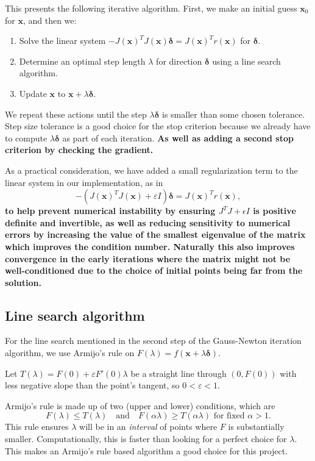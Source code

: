 \documentclass[12pt, a4paper]{article}
\newcommand{\bx}{{\boldsymbol{x}}}
\newcommand{\bd}{{\boldsymbol{\delta}}}
\begin{document}
This presents the following iterative algorithm. First, we make an initial guess $\bx_0$ for $\bx$, and then we:
\begin{enumerate}
    \item Solve the linear system $-{J(\bx)}^T J(\bx)\bd={J(\bx)}^T r(\bx)$ for $\bd$.
    \item Determine an optimal step length $\lambda$ for direction $\bd$ using a line search algorithm.
    \item Update $\bx$ to $\bx+\lambda\bd$.
\end{enumerate}
We repeat these actions until the step $\lambda\bd$ is smaller than some chosen tolerance. Step size tolerance is a good choice for the stop criterion because we already have to compute $\lambda\bd$ as part of each iteration. \textbf{As well as adding a second stop criterion by checking the gradient.}

As a practical consideration, we have added a small regularization term to the linear system in our implementation, as in \[-({J(\bx)}^T J(\bx)+\varepsilon I)\bd={J(\bx)}^T r(\bx),\] \textbf{to help prevent numerical instability by ensuring $J^T J+\epsilon I$ is positive definite and invertible, as well as reducing sensitivity to numerical errors by increasing the value of the smallest eigenvalue of the matrix which improves the condition number. Naturally this also improves convergence in the early iterations where the matrix might not be well-conditioned due to the choice of initial points being far from the solution.}

\subsection{Line search algorithm}

For the line search mentioned in the second step of the Gauss-Newton iteration algorithm, we use Armijo's rule on $F(\lambda)=f(\bx+\lambda\bd)$.

Let $T(\lambda)=F(0)+\varepsilon F'(0)\lambda$ be a straight line through $(0,F(0))$ with less negative slope than the point's tangent, so $0<\varepsilon<1$.

Armijo's rule is made up of two (upper and lower) conditions, which are\[F(\lambda)\le T(\lambda)\quad\text{and}\quad F(\alpha\lambda)\ge T(\alpha\lambda)\text{ for fixed }\alpha>1.\]
This rule ensures $\lambda$ will be in an \textit{interval} of points where $F $ is substantially smaller. Computationally, this is faster than looking for a perfect choice for $\lambda$. This makes an Armijo's rule based algorithm a good choice for this project.
\end{document}
